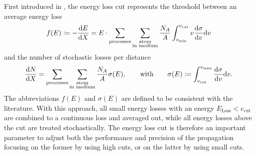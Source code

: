 First introduced in \cite{Lipari91}, the energy loss cut represents the threshold between an average energy loss
\begin{align} \label{eq:cuts_dedx}
    f(E) \coloneqq -\frac{\mathrm{d} E}{\mathrm{d} X} = 
        E \cdot \sum_\text{processes} \sum_{\substack{\text{atom} \\ \text{in medium}}}
        \frac{N_A}{A} \int_{v_{\min}}^{v_{\textrm{cut}}} v \frac{\mathrm{d} \sigma}{\mathrm{d} v} \mathrm{d} v
\end{align}
and the number of stochastic losses per distance
\begin{align} \label{eq:cuts_dndx}
    \frac{\mathrm{d} N}{\mathrm{d} X} = 
        \sum_\text{processes} \sum_{\substack{\text{atom} \\ \text{in medium}}}
        \frac{N_A}{A} \sigma(E) ,
    \qquad \text{with} \qquad
    \sigma(E) \coloneqq \int_{v_{\text{cut}}}^{v_{\max}} \frac{\mathrm{d} \sigma}{\mathrm{d} v} \mathrm{d} v .
\end{align}
The abbreviations $f(E)$ and $\sigma(E)$ are defined to be consistent with the literature.
With this approach, all small energy losses with an energy $E_{\text{Loss}} < e_{\text{cut}}$ are combined to a continuous loss and averaged out, while all energy losses above the cut are treated stochastically.
The energy loss cut is therefore an important parameter to adjust both the performance and precision of the propagation focusing on the former by using high cuts, or on the latter by using small cuts.
